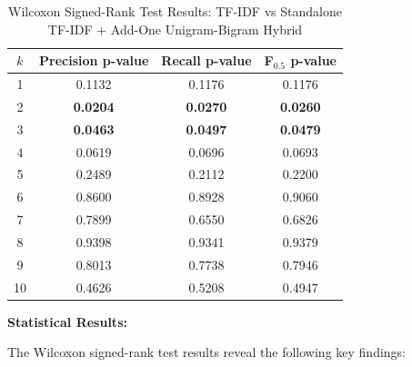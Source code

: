 \begin{table}[H]
\centering
\caption{Wilcoxon Signed-Rank Test Results: TF-IDF vs Standalone TF-IDF + Add-One Unigram-Bigram Hybrid}
\label{tab:wilcoxon_bigram_smoothing_results}
\begin{tabular}{|c|c|c|c|}
\hline
$k$ & Precision p-value & Recall p-value & F$_{0.5}$ p-value \\
\hline
1  & 0.1132 & 0.1176 & 0.1176 \\
2  & \textbf{0.0204} & \textbf{0.0270} & \textbf{0.0260} \\
3  & \textbf{0.0463} & \textbf{0.0497} & \textbf{0.0479} \\
4  & 0.0619 & 0.0696 & 0.0693 \\
5  & 0.2489 & 0.2112 & 0.2200 \\
6  & 0.8600 & 0.8928 & 0.9060 \\
7  & 0.7899 & 0.6550 & 0.6826 \\
8  & 0.9398 & 0.9341 & 0.9379 \\
9  & 0.8013 & 0.7738 & 0.7946 \\
10 & 0.4626 & 0.5208 & 0.4947 \\
\hline
\end{tabular}
\end{table}

\vspace{0.2cm}

\textbf{Statistical Results:}

The Wilcoxon signed-rank test results reveal the following key findings:

